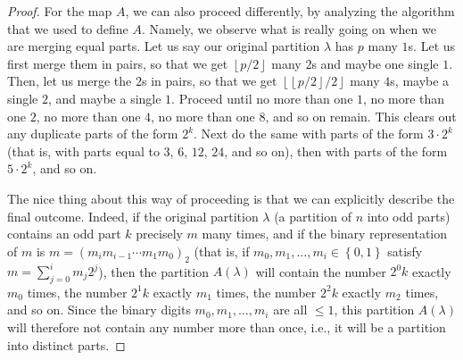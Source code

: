 \begin{proof}
For the map $A$, we can also proceed differently, by analyzing the algorithm
that we used to define $A$. Namely, we observe what is really going on when we
are merging equal parts. Let us say our original partition $\lambda$ has $p$
many $1$s. Let us first merge them in pairs, so that we get $\left\lfloor
p/2\right\rfloor $ many $2$s and maybe one single $1$. Then, let us merge the
$2$s in pairs, so that we get $\left\lfloor \left\lfloor p/2\right\rfloor
/2\right\rfloor $ many $4$s, maybe a single $2$, and maybe a single $1$.
Proceed until no more than one $1$, no more than one $2$, no more than one
$4$, no more than one $8$, and so on remain. This clears out any duplicate
parts of the form $2^{k}$. Next do the same with parts of the form
$3\cdot2^{k}$ (that is, with parts equal to $3$, $6$, $12$, $24$, and so on),
then with parts of the form $5\cdot2^{k}$, and so on.

The nice thing about this way of proceeding is that we can explicitly describe
the final outcome. Indeed, if the original partition $\lambda$ (a partition of
$n$ into odd parts) contains an odd part $k$ precisely $m$ many times, and if
the binary representation of $m$ is $m=\left(  m_{i}m_{i-1}\cdots m_{1}%
m_{0}\right)  _{2}$ (that is, if $m_{0},m_{1},\ldots,m_{i}\in\left\{
0,1\right\}  $ satisfy $m=\sum_{j=0}^{i}m_{j}2^{j}$), then the partition
$A\left(  \lambda\right)  $ will contain the number $2^{0}k$ exactly $m_{0}$
times, the number $2^{1}k$ exactly $m_{1}$ times, the number $2^{2}k$ exactly
$m_{2}$ times, and so on. Since the binary digits $m_{0},m_{1},\ldots,m_{i}$
are all $\leq1$, this partition $A\left(  \lambda\right)  $ will therefore not
contain any number more than once, i.e., it will be a partition into distinct parts.


\end{proof}
